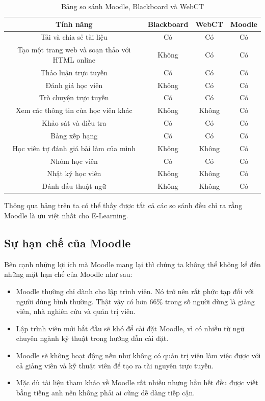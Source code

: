 \begin{itemize}
	\begin{center}
		\begin{table}[!htp]
			\centering
			\begin{tabular}{|c|c|c|c|}
				\hline 
				{\bf Tính năng} & {\bf Blackboard} & {\bf WebCT} & {\bf Moodle} \\ 
				\hline 
				Tải và chia sẻ tài liệu & Có & Có & Có \\ 
				\hline 
				Tạo một trang web và soạn thảo với HTML online & Không & Có & Có \\ 
				\hline 
				Thảo luận trực tuyến & Có & Có & Có \\ 
				\hline 
				Đánh giá học viên & Không & Có & Có \\ 
				\hline 
				Trò chuyện trực tuyến & Có & Có & Có \\ 
				\hline 
				Xem các thông tin của học viên khác & Không & Không & Có \\ 
				\hline 
				Khảo sát và điều tra & Có & Có & Có \\ 
				\hline 
				Bảng xếp hạng & Có & Có & Có \\ 
				\hline 
				Học viên tự đánh giá bài làm của mình & Không & Không & Có \\ 
				\hline 
				Nhóm học viên & Có & Có & Có \\ 
				\hline 
				Nhật ký học viên & Không & Không & Có \\ 
				\hline 
				Đánh dấu thuật ngữ & Không & Không & Có \\ 
				\hline 
			\end{tabular} 
			\caption{Bảng so sánh Moodle, Blackboard và WebCT \cite{moodle-blackboard-webct}}
			\label{bang2}
		\end{table}
	\end{center}
	Thông qua bảng trên ta có thể thấy được tất cả các so sánh đều chỉ ra rằng Moodle là ưu việt nhất cho E-Learning.
\end{itemize}

\subsection{Sự hạn chế của Moodle}
Bên cạnh những lợi ích mà Moodle mang lại thì chúng ta không thể không kể đến những mặt hạn chế của Moodle như sau:

\begin{itemize}
	\item Moodle thường chỉ dành cho lập trình viên. Nó trở nên rất phức tạp đối với người dùng bình thường. Thật vậy có hơn 66\% \cite{limitmoodle:1} trong số người dùng là giảng viên, nhà nghiên cứu và quản trị viên. 
	\item Lập trình viên mới bắt đầu sẽ khó để cài đặt Moodle, vì có nhiều từ ngữ chuyên ngành kỹ thuật trong hướng dẫn cài đặt. \cite{limitmoodle:2}
	\item Moodle sẽ không hoạt động nếu như không có quản trị viên làm việc được với cả giảng viên và kỹ thuật viên để tạo ra tài nguyên trực tuyến. \cite{whymoodle}
	\item Mặc dù tài liệu tham khảo về Moodle rất nhiều nhưng hầu hết đều được viết bằng tiếng anh nên không phải ai cũng dễ dàng tiếp cận.
\end{itemize}


